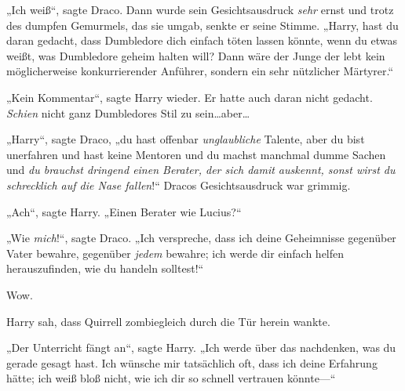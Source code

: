 „Ich weiß“, sagte Draco. Dann wurde sein Gesichtsausdruck \emph{sehr} ernst und trotz des dumpfen Gemurmels, das sie umgab, senkte er seine Stimme. „Harry, hast du daran gedacht, dass Dumbledore dich einfach töten lassen könnte, wenn du etwas weißt, was Dumbledore geheim halten will? Dann wäre der Junge der lebt kein möglicherweise konkurrierender Anführer, sondern ein sehr nützlicher Märtyrer.“

„Kein Kommentar“, sagte Harry wieder. Er hatte auch daran nicht gedacht. \emph{Schien} nicht ganz Dumbledores Stil zu sein…aber…

„Harry“, sagte Draco, „du hast offenbar \emph{unglaubliche} Talente, aber du bist unerfahren und hast keine Mentoren und du machst manchmal dumme Sachen und \emph{du brauchst dringend einen Berater, der sich damit auskennt, sonst wirst du schrecklich auf die Nase fallen}!“ Dracos Gesichtsausdruck war grimmig.

„Ach“, sagte Harry. „Einen Berater wie Lucius?“

„Wie \emph{mich}!“, sagte Draco. „Ich verspreche, dass ich deine Geheimnisse gegenüber Vater bewahre, gegenüber \emph{jedem} bewahre; ich werde dir einfach helfen herauszufinden, wie du handeln solltest!“

Wow.

Harry sah, dass Quirrell zombiegleich durch die Tür herein wankte.

„Der Unterricht fängt an“, sagte Harry. „Ich werde über das nachdenken, was du gerade gesagt hast. Ich wünsche mir tatsächlich oft, dass ich deine Erfahrung hätte; ich weiß bloß nicht, wie ich dir so schnell vertrauen könnte—“

